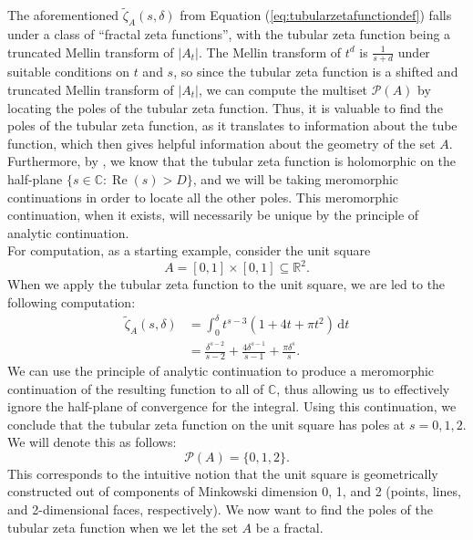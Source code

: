\documentclass{article}
\theoremstyle{plain}
\numberwithin{equation}{section}
\numberwithin{table}{section}
\numberwithin{figure}{section}
\DeclareMathOperator{\re}{Re}
\newcommand{\vaddspace}[1]{\rule{0pt}{#1pt}}
\newcommand{\newparagraph}{\vaddspace{10}}
\begin{document}
The aforementioned $\tilde{\zeta}_A(s,\delta)$ from Equation (\ref{eq:tubularzetafunctiondef}) falls under a class of ``fractal zeta functions'', with the tubular zeta function being a truncated Mellin transform of $|A_t|$. The Mellin transform of $t^d$ is $\frac{1}{s+d}$ under suitable conditions on $t$ and $s$, so since the tubular zeta function is a shifted and truncated Mellin transform of $|A_t|$, we can compute the multiset $\mathscr{P}(A)$ by locating the poles of the tubular zeta function. Thus, it is valuable to find the poles of the tubular zeta function, as it translates to information about the tube function, which then gives helpful information about the geometry of the set $A$. Furthermore, by \cite[Theorem 2.2.1]{lapidusbook}, we know that the tubular zeta function is holomorphic on the half-plane $\{s \in \mathbb{C} : \re(s) > D\}$, and we will be taking meromorphic continuations in order to locate all the other poles. This meromorphic continuation, when it exists, will necessarily be unique by the principle of analytic continuation. \\

For computation, as a starting example, consider the unit square
\begin{equation}
A = [0,1] \times [0,1] \subseteq \mathbb{R}^2.
\end{equation}
When we apply the tubular zeta function to the unit square, we are led to the following computation:
\begin{align}
\tilde{\zeta}_A(s,\delta) &= \int_0^{\delta} t^{s-3} (1+4t+\pi t^2) \,\mathrm{d}t \nonumber \\
&= \frac{\delta^{s-2}}{s-2} + \frac{4\delta^{s-1}}{s-1} + \frac{\pi\delta^s}{s}.
\end{align}
We can use the principle of analytic continuation to produce a meromorphic continuation of the resulting function to all of $\mathbb{C}$, thus allowing us to effectively ignore the half-plane of convergence for the integral. Using this continuation, we conclude that the tubular zeta function on the unit square has poles at $s = 0,1,2$. We will denote this as follows:
\begin{equation}
\mathscr{P}(A) = \{0,1,2\}.
\end{equation}
This corresponds to the intuitive notion that the unit square is geometrically constructed out of components of Minkowski dimension 0, 1, and 2 (points, lines, and 2-dimensional faces, respectively). We now want to find the poles of the tubular zeta function when we let the set $A$ be a fractal.
\newparagraph
\end{document}
